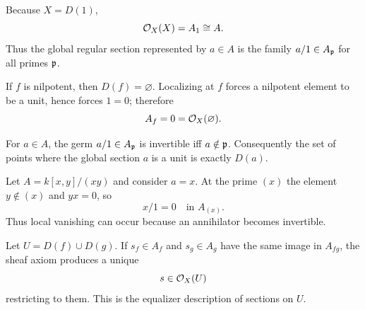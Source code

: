 \begin{example}
Because $X=D(1)$,
\[
\mathcal O_X(X)=A_1\cong A.
\]
Thus the global regular section represented by $a\in A$ is the family $a/1\in A_{\mathfrak p}$ for all primes $\mathfrak p$.
\end{example}

\begin{example}
If $f$ is nilpotent, then $D(f)=\varnothing$.  Localizing at $f$ forces a nilpotent element to be a unit, hence forces $1=0$; therefore
\[
A_f=0=\mathcal O_X(\varnothing).
\]
\end{example}

\begin{example}
For $a\in A$, the germ $a/1\in A_{\mathfrak p}$ is invertible iff $a\notin\mathfrak p$.  Consequently the set of points where the global section $a$ is a unit is exactly $D(a)$.
\end{example}

\begin{example}
Let $A=k[x,y]/(xy)$ and consider $a=x$.  At the prime $(x)$ the element $y\notin(x)$ and $yx=0$, so
\[
x/1=0\quad\text{in }A_{(x)}.
\]
Thus local vanishing can occur because an annihilator becomes invertible.
\end{example}

\begin{example}
Let $U=D(f)\cup D(g)$.  If $s_f\in A_f$ and $s_g\in A_g$ have the same image in $A_{fg}$, the sheaf axiom produces a unique
\[
s\in\mathcal O_X(U)
\]
restricting to them.  This is the equalizer description of sections on $U$.
\end{example}
